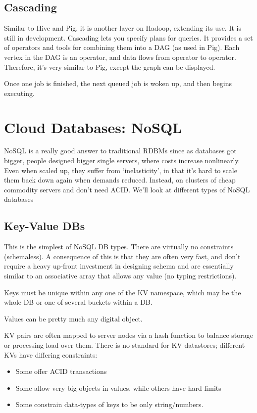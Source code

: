 \documentclass[11pt,a4paper,titlepage,dvipsnames,cmyk]{scrartcl}
\begin{document}
\subsection{Cascading}
Similar to Hive and Pig, it is another layer on Hadoop, extending its use. It is still in development. Cascading lets you specify plans for queries. It provides a set of operators and tools for combining them into a DAG (as used in Pig). Each vertex in the DAG is an operator, and data flows from operator to operator. Therefore, it's very similar to Pig, except the graph can be displayed.

Once one job is finished, the next queued job is woken up, and then begins executing.

\section{Cloud Databases: NoSQL}
NoSQL is a really good answer to traditional RDBMs since as databases got bigger, people designed bigger single servers, where costs increase nonlinearly. Even when scaled up, they suffer from `inelasticity', in that it's hard to scale them back down again when demands reduced. Instead,  on clusters of cheap commodity servers and don't need ACID. We'll look at different types of NoSQL databases

\subsection{Key-Value DBs}
This is the simplest of NoSQL DB types. There are virtually no constraints (schemaless). A consequence of this is that they are often very fast, and don't require a heavy up-front investment in designing schema and are essentially similar to an associative array that allows any value (no typing restrictions).

Keys must be unique within any one of the KV namespace, which may be the whole DB or one of several buckets within a DB.

Values can be pretty much any digital object.

KV pairs are often mapped to server nodes via a hash function to balance storage or processing load over them. There is no standard for KV datastores; different KVs have differing constraints:
\begin{itemize}
    \item Some offer ACID transactions
    \item Some allow very big objects in values, while others have hard limits
    \item Some constrain data-types of keys to be only string/numbers.
\end{itemize}
\end{document}
